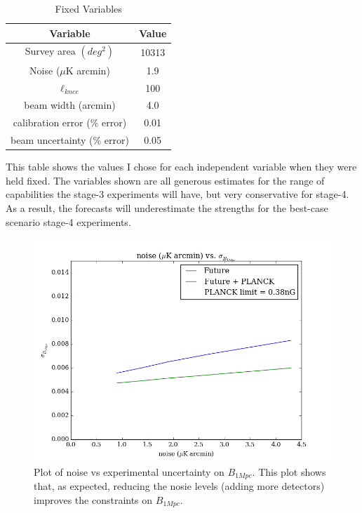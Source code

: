 \begin{table}[h]
\centering
\caption{Fixed Variables}

\label{my-label}
\begin{tabular}{l|l}
\multicolumn{1}{c}{Variable} & \multicolumn{1}{|c}{Value} \\ \hline
\multicolumn{1}{c}{Survey area $(deg^2)$} & \multicolumn{1}{|c}{10313}  \\
\multicolumn{1}{c}{Noise ($\mu$K arcmin)} & \multicolumn{1}{|c}{1.9}   \\
\multicolumn{1}{c}{$\ell_{knee}$} & \multicolumn{1}{|c}{100} \\
\multicolumn{1}{c}{beam width (arcmin)} & \multicolumn{1}{|c}{4.0}   \\
\multicolumn{1}{c}{calibration error (\% error)} & \multicolumn{1}{|c}{0.01} \\
\multicolumn{1}{c}{beam uncertainty (\% error)} & \multicolumn{1}{|c}{0.05}
\end{tabular}
\begin{flushleft}
This table shows the values I chose for each independent variable when they were held fixed. The variables shown are all generous estimates for the range of capabilities the stage-3 experiments will have, but very conservative for stage-4. As a result, the forecasts will underestimate the strengths for the best-case scenario stage-4 experiments.
\end{flushleft}
\end{table}

\begin{figure}[h]
\centering
\includegraphics[scale=0.8]{images/noise.png}
\caption{Plot of noise vs experimental uncertainty on $B_{1Mpc}$. This plot shows that, as expected, reducing the nosie levels (adding more detectors) improves the constraints on $B_{1Mpc}$.}
\label{fig:noise}
\end{figure}

